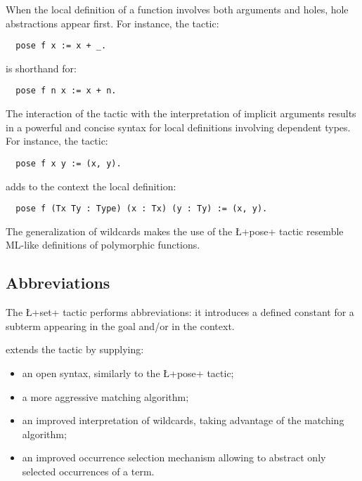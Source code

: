 When the local definition of a function involves both arguments and
holes, hole abstractions appear first. For instance, the
tactic:
\begin{lstlisting}
  pose f x := x + _.
\end{lstlisting}
is shorthand for:
\begin{lstlisting}
  pose f n x := x + n.
\end{lstlisting}


The interaction of the  tactic with the interpretation of
implicit arguments results in a powerful and concise syntax for local
definitions involving dependent types.
For instance, the tactic:
\begin{lstlisting}
  pose f x y := (x, y).
\end{lstlisting}
adds to the context the local definition:
\begin{lstlisting}
  pose f (Tx Ty : Type) (x : Tx) (y : Ty) := (x, y).
\end{lstlisting}
The generalization of wildcards makes the use of the \L+pose+ tactic
resemble ML-like definitions of polymorphic functions.




\subsection{Abbreviations}\label{ssec:set}


The \ssr{} \L+set+ tactic performs abbreviations: it introduces a
defined constant for a subterm appearing in the goal and/or in the
context.

\ssr{} extends the  tactic by supplying:
\begin{itemize}
\item an open syntax, similarly to the \L+pose+ tactic;
\item a more aggressive matching algorithm;
\item an improved interpretation of wildcards, taking advantage of the
  matching algorithm;
\item an improved occurrence selection mechanism allowing to abstract only
  selected occurrences of a term.
\end{itemize}

